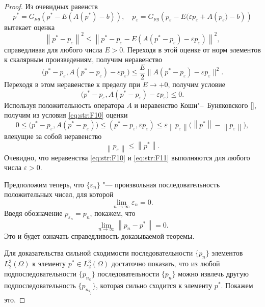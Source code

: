 \begin{proof}
Из очевидных равенств
$$p^{*} =G_{\mu g} \left(p^{*} -E  \left(A(p^{*})-b\right)\right),\quad  
p_{\varepsilon } =G_{\mu g} \left(p_{\varepsilon } -E  \bigl(\varepsilon p_{\varepsilon } +A\left(p_{\varepsilon } \bigr)-b\right)\right)$$ 
вытекает оценка
$$\left\| p^{*} -p_{\varepsilon } \right\| ^{2} \le \left\| p^{*} -p_{\varepsilon } -E  \left(A(p^{*} -p_{\varepsilon } )-\varepsilon p_{\varepsilon } \right)\right\| ^{2} ,$$ 
справедливая для любого числа $E>0$.
Переходя в этой оценке от норм элементов к скалярным произведениям, получим неравенство
$$
\bigl(p^{*} -p_{\varepsilon } ,A\left(p^{*} -p_{\varepsilon } \right)-\varepsilon p_{\varepsilon } \bigr)\le \frac{E}{2} \bigl\| A\left(p^{*} -p_{\varepsilon } \right)-\varepsilon p_{\varepsilon } \bigr\| ^{2} .$$ 
Переходя в этом неравенстве к пределу при $E\to +0$, получим условие
\begin{equation}
\bigl(p^{*} -p_{\varepsilon } ,A\left(p^{*} -p_{\varepsilon } \right)-\varepsilon p_{\varepsilon } \bigr)\le 0.
\label{eq:str:F10} 
\end{equation}                                      
Используя положительность оператора $A$ и неравенство Коши"--~Буняковского [], получим из условия \eqref{eq:str:F10} оценки
$$
0\le \bigl(p^{*} -p_{\varepsilon } ,A\left(p^{*} -p_{\varepsilon } \right)\bigr)
\le \left(p^{*} -p_{\varepsilon } ,\varepsilon p_{\varepsilon } \right)\le 
\varepsilon \left\| p_{\varepsilon } \right\| \bigl(\left\| p^{*} \right\| -\left\| p_{\varepsilon } \right\| \bigr),$$
влекущие за собой неравенство
\begin{equation}
\left\| p_{\varepsilon } \right\| \le \left\| p^{*} \right\| .
 \label{eq:str:F11} 
\end{equation}   
Очевидно, что неравенства \eqref{eq:str:F10} и \eqref{eq:str:F11} выполняются для любого числа $\varepsilon >0$.

Предположим теперь, что $\{\varepsilon _{n} \}$ "--- произвольная последовательность положительных чисел, для которой $$\mathop{\lim }\limits_{n\to \infty } \varepsilon _{n} =0.$$
Введя обозначение $p_{\varepsilon _{n} } =p_{n} $, покажем, что
$$\mathop{\lim }\limits_{n\to \infty } \left\| p_{n} -p^{*} \right\| =0.$$ 
Это и будет означать справедливость доказываемой теоремы.

Для доказательства сильной сходимости последовательности $\{p_{n}\}$ элементов $L_{2}^{3} (\Omega)$ к элементу $p^{*} \in L_{2}^{3} (\Omega)$ достаточно показать, что из любой подпоследовательности $\{p_{n_{k} } \}$ последовательности $\{p_{n} \}$ можно извлечь другую подпоследовательность $\{p_{n_{k_{j} } } \}$, которая сильно сходится к элементу $p^{*} $.
Покажем это.


\end{proof}
